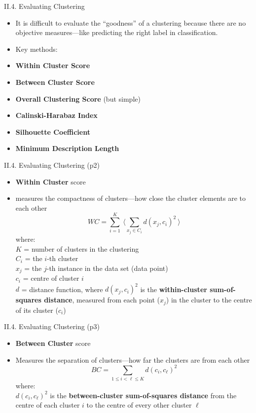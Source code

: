 \documentclass[handout]{beamer}
\newcommand{\strong}[1]{\textbf{\color{teal} #1}}
\newcommand{\stronger}[1]{\textbf{\color{purple} #1}}
\begin{document}
\begin{frame}{II.4. Evaluating Clustering}
\begin{itemize}
\item[] It is difficult to evaluate the ``goodness'' of a clustering because there are no objective measures---like predicting the right label in classification.
\item[] Key methods:
\item \stronger{Within Cluster Score}
\item \stronger{Between Cluster Score}
\item \stronger{Overall Clustering Score} (but simple)
\item \stronger{Calinski-Harabaz Index}
\item \stronger{Silhouette Coefficient}
\item \stronger{Minimum Description Length}
\end{itemize}
\end{frame}
\begin{frame}{II.4. Evaluating Clustering (p2)}
\begin{itemize}
\item \stronger{Within Cluster} score
\item measures the compactness of clusters---how close the cluster elements are to each other
\[
WC = \sum_{i=1}^{K} ~ \langle \sum_{x_j \in C_i}{ d(x_j,c_i)^2 } ~ \rangle
\]
where:\\
$K$ = number of clusters in the clustering\\
$C_i$ = the $i$-th cluster\\
$x_j$ = the $j$-th instance in the data set (data point)\\
$c_i$ = centre of cluster $i$\\
$d$ = distance function, where $d(x_j,c_i)^2$ is the \strong{within-cluster sum-of-squares distance}, measured from each point ($x_j$) in the cluster to the centre of its cluster ($c_i$)
\end{itemize}
\end{frame}
\begin{frame}{II.4. Evaluating Clustering (p3)}
\begin{itemize}
\item \stronger{Between Cluster} score
\item Measures the separation of clusters---how far the clusters are from each other
\[
BC = \sum_{1 \le i < \ell \le K}{ d(c_i,c_\ell)^2 }
\]
where:\\
$d(c_i,c_\ell)^2$ is the \stronger{between-cluster sum-of-squares distance} from the centre of each cluster $i$ to the centre of every other cluster $\ell$
\end{itemize}
\end{frame}
\end{document}
